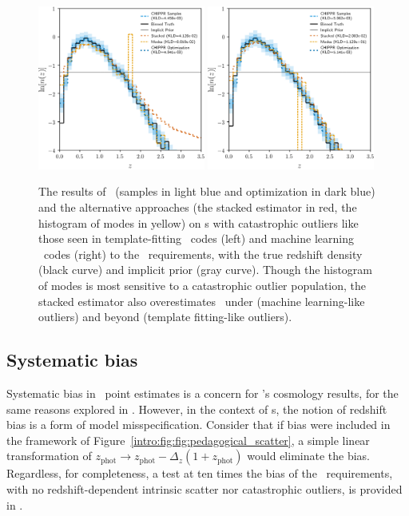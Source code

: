 \begin{figure}
	\includegraphics[width=0.49\textwidth]{figures/chippr/thesis_eout_log_estimators.png}
	\includegraphics[width=0.49\textwidth]{figures/chippr/thesis_rout_log_estimators.png}
	\caption{
		The results of \Chippr\ (samples in light blue and optimization in dark blue) and the alternative approaches (the stacked estimator in red, the histogram of modes in yellow) on \pzpdf s with catastrophic outliers like those seen in template-fitting \pzpdf\ codes (left) and machine learning \pzpdf\ codes (right) to the \lsst\ requirements, with the true redshift density (black curve) and implicit prior (gray curve).
		Though the histogram of modes is most sensitive to a catastrophic outlier population, the stacked estimator also overestimates \nz\ under (machine learning-like outliers) and beyond (template fitting-like outliers).
	}
\end{figure}

\subsection{Systematic bias}

Systematic bias in \pz\ point estimates is a concern for \lsst's cosmology results, for the same reasons explored in \citet{hoyle_dark_2017}.
However, in the context of \pzpdf s, the notion of redshift bias is a form of model misspecification.
Consider that if bias were included in the framework of Figure~\ref{intro:fig:fig:pedagogical_scatter}, a simple linear transformation of $z_{\mathrm{phot}} \to z_{\mathrm{phot}} - \Delta_{z} (1 + z_{\mathrm{phot}})$ would eliminate the bias.
Regardless, for completeness, a test at ten times the bias of the \lsst\ requirements, with no redshift-dependent intrinsic scatter nor catastrophic outliers, is provided in .

